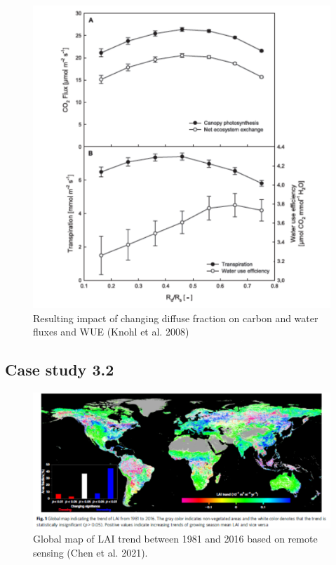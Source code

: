 \documentclass[
  oneside]{book}
\begin{document}
\begin{figure}

{\centering \includegraphics[width=0.8\linewidth]{figures/chap3/f333_knohl2} 

}

\caption{Resulting impact of changing diffuse fraction on carbon and water fluxes and WUE (Knohl et al. 2008)}\label{fig:f333}
\end{figure}

\hypertarget{case-study-3.2}{%
\subsection{Case study 3.2}\label{case-study-3.2}}

\begin{figure}

{\centering \includegraphics[width=0.8\linewidth]{figures/chap3/f334_chen1} 

}

\caption{Global map of LAI trend between 1981 and 2016 based on remote sensing (Chen et al. 2021).}\label{fig:f334}
\end{figure}
\end{document}
